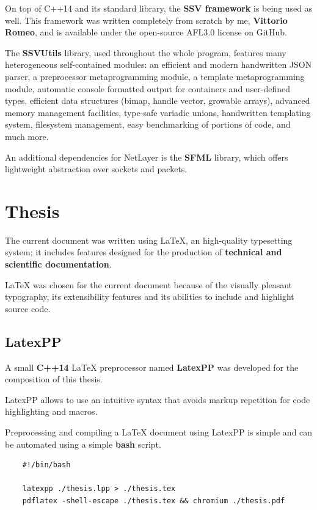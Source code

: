 \documentclass[11pt]{report}
\newcommand{\+}{\discretionary{\mbox{\scriptsize$\hookleftarrow$}}{}{}}
\renewcommand\emph{\textbf}
\begin{document}
                On top of C++14 and its standard library, the \emph{SSV framework} is being used as well. This framework was written completely from scratch by me, \emph{Vittorio Romeo}, and is available under the open-source AFL3.0 license on GitHub.

                The \emph{SSVUtils} library, used throughout the whole program, features many heterogeneous self-contained modules: an efficient and modern handwritten JSON parser, a preprocessor metaprogramming module, a template metaprogramming module, automatic console formatted output for containers and user-defined types, efficient data structures (bimap, handle vector, growable arrays), advanced memory management facilities, type-safe variadic unions, handwritten templating system, filesystem management, easy benchmarking of portions of code, and much more.

                An additional dependencies for NetLayer is the \emph{SFML} library, which offers lightweight abstraction over sockets and packets.

            \section{Thesis}
                The current document was written using \LaTeX{}, an high-quality typesetting system; it includes features designed for the production of \emph{technical and scientific documentation}.

                \LaTeX{} was chosen for the current document because of the visually pleasant typography, its extensibility features and its abilities to include and highlight source code.

                \subsection{LatexPP}
                    A small \emph{C++14} \LaTeX{} preprocessor named \emph{LatexPP} was developed for the composition of this thesis.

                    LatexPP allows to use an intuitive syntax that avoids markup repetition for code highlighting and macros.

                    Preprocessing and compiling a \LaTeX{} document using LatexPP is simple and can be automated using a simple \emph{bash} script.


\begin{verbatim}
    #!/bin/bash

    latexpp ./thesis.lpp > ./thesis.tex
    pdflatex -shell-escape ./thesis.tex && chromium ./thesis.pdf
\end{verbatim}
\end{document}
